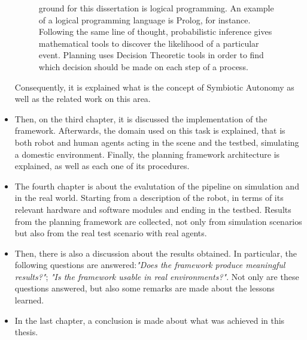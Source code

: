 \begin{itemize}
\begin{figure}[H]
{          ground for this dissertation is logical programming. An example of a
          logical programming language is Prolog, for instance. Following the
          same line of thought, probabilistic inference gives mathematical tools
          to discover the likelihood of a particular event. Planning uses
          Decision Theoretic tools in order to find which decision should be
          made on each step of a process.}
          \label{fig:diagramofthesis}
  \end{figure}
  Consequently, it is explained what is the
  concept of Symbiotic Autonomy as well as the related work on this area.
  \item Then, on the third chapter, it is discussed the implementation of the
  framework. Afterwards, the domain used on this task is explained, that is both
  robot and human agents acting in the scene and the testbed, simulating a
  domestic environment. Finally, the planning framework architecture is
  explained, as well as each one of its procedures.
  \item The fourth chapter is about the evalutation of the pipeline on simulation 
  and in the real world. Starting from a description of the robot, in terms of its relevant
  hardware and software modules and ending in the testbed. Results from the planning framework are collected,
  not only from simulation scenarios but also from the real test scenario with
  real agents. 
  \item Then, there is also a discussion about the results obtained. In
  particular, the following questions are answered:\textit{"Does the
  framework produce meaningful results?"}; \textit{"Is the framework usable in real
  environments?"}.
  Not only are these questions answered, but also some remarks are made about
  the lessons learned.

  \item In the last chapter, a conclusion is made about what was achieved in this thesis.
\end{itemize}
